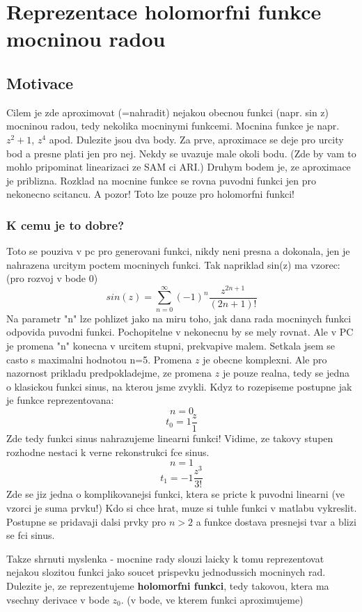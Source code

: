 \chapter{Reprezentace holomorfni funkce mocninou radou}

\section*{Motivace}

Cilem je zde aproximovat (=nahradit) nejakou obecnou funkci (napr. sin z) mocninou radou, tedy nekolika mocninymi funkcemi. Mocnina funkce je napr. $z^2+1$, $z^4$ apod. Dulezite jsou dva body. Za prve, aproximace se deje pro urcity bod a presne plati jen pro nej. Nekdy se uvazuje male okoli bodu. (Zde by vam to mohlo pripominat linearizaci ze SAM ci ARI.) Druhym bodem je, ze aproximace je priblizna. Rozklad na mocnine funkce se rovna puvodni funkci jen pro nekonecno scitancu. A pozor! Toto lze pouze pro holomorfni funkci!

\subsection*{K cemu je to dobre?}
Toto se pouziva v pc pro generovani funkci, nikdy neni presna a dokonala, 
jen je nahrazena urcitym poctem mocninych funkci. 
Tak napriklad sin(z) ma vzorec: (pro rozvoj v bode 0)
$$sin(z) = \sum_{n=0}^{\infty} (-1)^n \frac{z^{2n+1}}{(2n+1)!}$$
Na parametr "n" lze pohlizet jako na miru toho, jak dana rada mocninych funkci odpovida puvodni funkci. 
Pochopitelne v nekonecnu by se mely rovnat. 
Ale v PC je promena "n" konecna v urcitem stupni, prekvapive malem.
Setkala jsem se casto s maximalni hodnotou n=5.
Promena $z$ je obecne komplexni. Ale pro nazornost prikladu predpokladejme, ze promena $z$ je pouze realna,
tedy se jedna o klasickou funkci sinus, na kterou jsme zvykli.
Kdyz to rozepiseme postupne jak je funkce reprezentovana:
$$n=0$$
$$t_0 = 1 \frac{z}{1}$$
Zde tedy funkci sinus nahrazujeme linearni funkci! 
Vidime, ze takovy stupen rozhodne nestaci k verne rekonstrukci fce sinus.
$$n=1$$
$$t_1 = -1 \frac{z^3}{3!}$$
Zde se jiz jedna o komplikovanejsi funkci, ktera se pricte k puvodni linearni (ve vzorci je suma prvku!)
Kdo si chce hrat, muze si tuhle funkci v matlabu vykreslit.
Postupne se pridavaji dalsi prvky pro $n>2$ a funkce dostava presnejsi tvar a blizi se fci sinus. 

Takze shrnuti myslenka - mocnine rady slouzi laicky k tomu reprezentovat nejakou slozitou funkci jako soucet prispevku jednodussich mocninych rad.
Dulezite je, ze reprezentujeme \textbf{holomorfni funkci}, tedy takovou, ktera ma vsechny derivace v bode $z_0$. (v bode, ve kterem funkci aproximujeme)



